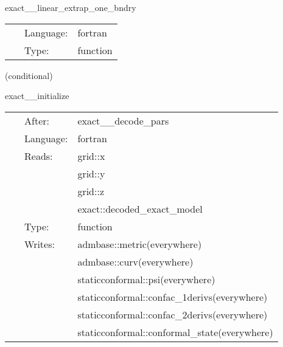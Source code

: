 \vspace{5mm}

\noindent {\bf } 

\hspace{5mm} exact\_\_linear\_extrap\_one\_bndry 

\hspace{5mm}{\it  } 


\hspace{5mm}

 \begin{tabular*}{160mm}{cll} 
~ & Language:  & fortran \\ 
~ & Type:  & function \\ 
\end{tabular*} 


\vspace{5mm}

   (conditional) 

\hspace{5mm} exact\_\_initialize 

\hspace{5mm}{\it set initial data from exact solution on a trivial slice } 


\hspace{5mm}

 \begin{tabular*}{160mm}{cll} 
~ & After:  & exact\_\_decode\_pars \\ 
~ & Language:  & fortran \\ 
~ & Reads:  & grid::x \\ 
~& ~ &grid::y\\ 
~& ~ &grid::z\\ 
~& ~ &exact::decoded\_exact\_model\\ 
~ & Type:  & function \\ 
~ & Writes:  & admbase::metric(everywhere) \\ 
~& ~ &admbase::curv(everywhere)\\ 
~& ~ &staticconformal::psi(everywhere)\\ 
~& ~ &staticconformal::confac\_1derivs(everywhere)\\ 
~& ~ &staticconformal::confac\_2derivs(everywhere)\\ 
~& ~ &staticconformal::conformal\_state(everywhere)\\ 
\end{tabular*} 


\vspace{5mm}

